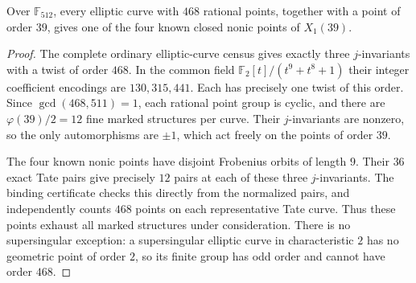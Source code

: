 \begin{lemma}\label{lem:nonic117-level39-fibres}
Over $\mathbb F_{512}$, every elliptic curve with $468$ rational points,
together with a point of order $39$, gives one of the four known
closed nonic points of $X_1(39)$.
\end{lemma}
\begin{proof}
The complete ordinary elliptic-curve census gives exactly three
$j$-invariants with a twist of order $468$.
In the common field $\mathbb F_2[t]/(t^9+t^8+1)$ their integer
coefficient encodings are $130,315,441$.
Each has precisely one twist of this order.
Since $\gcd(468,511)=1$, each rational point group is cyclic, and
there are $\varphi(39)/2=12$ fine marked structures per curve.
Their $j$-invariants are nonzero, so the only automorphisms are
$\pm1$, which act freely on the points of order $39$.

The four known nonic points have disjoint Frobenius orbits of length
$9$. Their $36$ exact Tate pairs give precisely $12$ pairs at each
of these three $j$-invariants. The binding certificate checks this
directly from the normalized pairs, and independently counts $468$
points on each representative Tate curve. Thus these points exhaust
all marked structures under consideration.
There is no supersingular exception: a supersingular elliptic curve
in characteristic $2$ has no geometric point of order $2$, so its
finite group has odd order and cannot have order $468$.
\end{proof}
